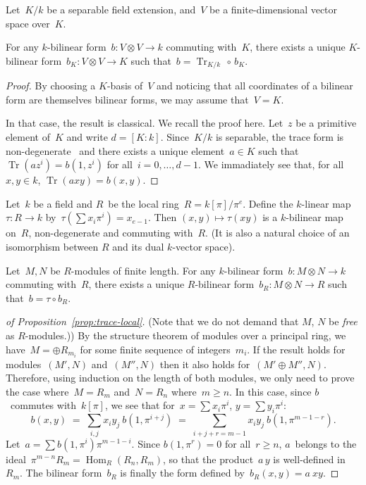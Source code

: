 \documentclass{lms}
\DeclareMathOperator\Hom{Hom}
\DeclareMathOperator\Tr{Tr}
\begin{document}
\begin{prop}\label{prop:trace-ext}
Let~$K/k$ be a separable field extension,
and~$V$ be a finite-dimensional vector space over~$K$.

For any $k$-bilinear form~$b: V ⊗ V → k$ commuting with~$K$, there
exists a unique $K$-bilinear form~$b_K: V ⊗ V → K$ such that~$b =
\Tr_{K/k} \,∘ \,b_K$.
\end{prop}
\begin{proof}
By choosing a $K$-basis of~$V$ and noticing that
all coordinates of a bilinear form are themselves bilinear forms,
we may assume that~$V = K$.

In that case, the result is classical. We recall the proof here.
Let~$z$ be a primitive element of~$K$ and write $d = [K:k]$.
Since~$K/k$ is separable, the trace form is
non-degenerate~\cite[VI~5.2]{lang-algebra}
and there exists a unique element~$a ∈ K$ such that
$\Tr (a z^i) = b(1, z^i)$ for all~$i=0, …, d-1$.
We immadiately see that, for all~$x, y ∈ k$, $\Tr (a x y) = b(x, y)$.

\end{proof}

Let~$k$ be a field and $R$~be the local ring~$R = k[π]/π^e$.
Define the $k$-linear map~$τ: R → k$ by~$τ(∑ x_i π^i) = x_{e-1}$.
Then $(x, y) ↦ τ(xy)$ is a $k$-bilinear map on~$R$,
non-degenerate and commuting with~$R$.
(It is also a natural choice of an isomorphism
between $R$ and its dual $k$-vector space).

\begin{prop}\label{prop:trace-local}
Let~$M, N$ be $R$-modules of finite length.
For any $k$-bilinear form~$b: M ⊗ N → k$ commuting with~$R$,
there exists a unique $R$-bilinear form~$b_R: M ⊗ N → R$
such that~$b = τ ∘ b_R$.
\end{prop}

\begin{proof}[{of Proposition~\ref{prop:trace-local}}]
(Note that we do not demand that $M$, $N$ be \emph{free} as
$R$-modules.))
By the structure theorem of modules over a principal ring,
we have~$M = ⊕ R_{m_i}$ for some finite sequence of integers~$m_i$.
If the result holds for modules~$(M', N)$ and~$(M'', N)$ then
it also holds for~$(M' ⊕ M'', N)$.
Therefore, using induction on the length of both modules,
we only need to prove the case where~$M = R_m$ and~$N = R_n$ where~$m ≥ n$.
In this case, since $b$~commutes with~$k[π]$,
we see that for~$x = ∑ x_i π^i$, $y = ∑ y_i π^i$:
\begin{equation}
b(x,y) \;=\; ∑_{i,j} x_i y_j\: b(1, π^{i+j})
  \;=\; ∑_{i+j+r = m-1} x_i y_j\: b(1, π^{m-1-r}).
\end{equation}
Let~$a = ∑ b(1, π^{i}) π^{m-1-i}$. Since $b(1, π^{r}) = 0$ for all~$r ≥
n$, $a$~belongs to the ideal~$π^{m-n} R_m = \Hom_R (R_n, R_m)$, so that
the product~$a\,y$ is well-defined in~$R_m$. The bilinear form~$b_R$ is
finally the form defined by~$b_R(x,y) = a\:x y$.
\end{proof}
\end{document}
